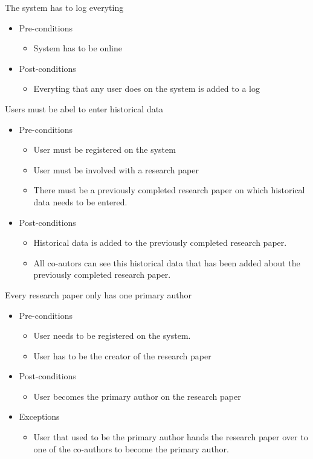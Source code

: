 \documentclass[a4paper,12pt]{report}
\begin{document}
	The system has to log everyting
	\begin{itemize}
		\item Pre-conditions
			\begin{itemize}
				\item System has to be online
			\end{itemize}
		\item Post-conditions
			\begin{itemize}
				\item Everyting that any user does on the system is added to a log
			\end{itemize}
	\end{itemize}

	Users must be abel to enter historical data
	\begin{itemize}
		\item Pre-conditions
			\begin{itemize}
				\item User must be registered on the system
				\item User must be involved with a research paper
				\item There must be a previously completed research paper on which historical data needs to be entered.
			\end{itemize}
		\item Post-conditions
			\begin{itemize}
				\item Historical data is added to the previously completed research paper.
				\item All co-autors can see this historical data that has been added about the previously completed research paper.
			\end{itemize}
	\end{itemize}

	Every research paper only has one primary author
	\begin{itemize}
		\item Pre-conditions
			\begin{itemize}
				\item User needs to be registered on the system.
				\item User has to be the creator of the research paper
			\end{itemize}
		\item Post-conditions
			\begin{itemize}
				\item User becomes the primary author on the research paper
			\end{itemize}
		\item Exceptions
			\begin{itemize}
				\item User that used to be the primary author hands the research paper over to one of the co-authors to become the primary author.
			\end{itemize}
	\end{itemize}
\end{document}

